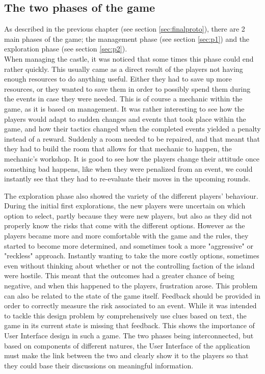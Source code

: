 \subsection{The two phases of the game}

As described in the previous chapter (see section \ref{sec:finalproto}), there are 2 main phases of the game; the management phase (see section \ref{sec:p1}) and the exploration phase (see section \ref{sec:p2}).\\When managing the castle, it was noticed that some times this phase could end rather quickly. This usually came as a direct result of the players not having enough resources to do anything useful. Either they had to save up more resources, or they wanted to save them in order to possibly spend them during the events in case they were needed. This is of course a mechanic within the game, as it is based on management. It was rather interesting to see how the players would adapt to sudden changes and events that took place within the game, and how their tactics changed when the completed events yielded a penalty instead of a reward. Suddenly a room needed to be repaired, and that meant that they had to build the room that allows for that mechanic to happen, the mechanic's workshop. It is good to see how the players change their attitude once something bad happens, like when they were penalized from an event, we could instantly see that they had to re-evaluate their moves in the upcoming rounds.

The exploration phase also showed the variety of the different players' behaviour. During the initial first explorations, the new players were uncertain on which option to select, partly because they were new players, but also as they did not properly know the risks that come with the different options. However as the players became more and more comfortable with the game and the rules, they started to become more determined, and sometimes took a more "aggressive" or "reckless" approach. Instantly wanting to take the more costly options, sometimes even without thinking about whether or not the controlling faction of the island were hostile. This meant that the outcomes had a greater chance of being negative, and when this happened to the players, frustration arose. This problem can also be related to the state of the game itself. Feedback should be provided in order to correctly measure the risk associated to an event. While it was intended to tackle this design problem by comprehensively use clues based on text, the game in its current state is missing that feedback. This shows the importance of User Interface design in such a game. The two phases being interconnected, but based on components of different natures, the User Interface of the application must make the link between the two and clearly show it to the players so that they could base their discussions on meaningful information.

